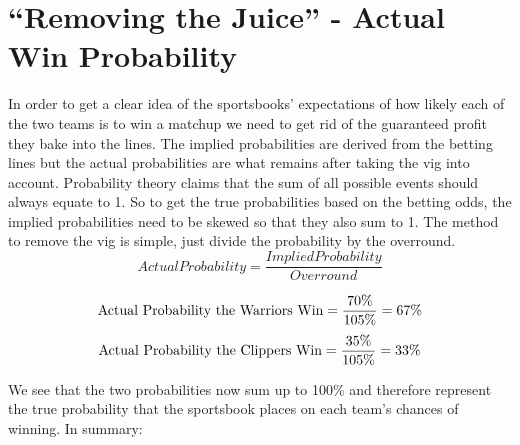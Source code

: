 \documentclass [MS] {uclathes}
\begin{document}
\section{``Removing the Juice'' - Actual Win Probability}
In order to get a clear idea of the sportsbooks' expectations of how likely each of the two teams is to win a matchup we need to get rid of the guaranteed profit they bake into the lines. The implied probabilities are derived from the betting lines but the actual probabilities are what remains after taking the vig into account. Probability theory claims that the sum of all possible events should always equate to 1. So to get the true probabilities based on the betting odds, the implied probabilities need to be skewed so that they also sum to 1. The method to remove the vig is simple, just divide the probability by the overround. \\

$$
\displaystyle
Actual Probability = \frac{Implied Probability}
{Overround}
$$

$$
\text{Actual Probability the Warriors Win} = \frac{70\%}{105\%} = 67\% \\
$$
$$
\text{Actual Probability the Clippers Win} = \frac{35\%}{105\%} = 33\% \\
$$

We see that the two probabilities now sum up to 100\% and therefore represent the true probability that the sportsbook places on each team's chances of winning. In summary: \\

\begin{table}[ht!]
\caption{Summary of betting values for sample wager}
\label{tab:bet-summary-table}
\end{table}
\end{document}
